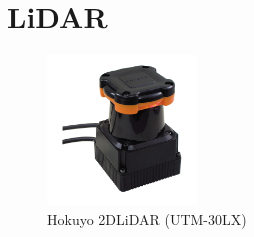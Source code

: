 
\section{LiDAR}

\begin{figure}[h]
  \centering
  \includegraphics[keepaspectratio, scale=0.80] {images/RobotGuidance_hokuyo_lidar.png}
  \caption{Hokuyo 2DLiDAR (UTM-30LX) \cite{hokuyo}}
  \label{Fig:hokuyo_lidar}
\end{figure}

\newpage
